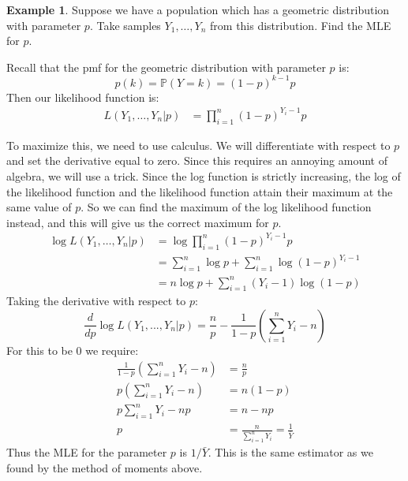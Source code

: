 \documentclass[12pt]{article}
\theoremstyle{definition}
\newtheorem*{example}{Example}
\theoremstyle{remark}
\begin{document}
\begin{example}Suppose we have a population which has a geometric distribution with parameter $p$. Take samples $Y_1, \dots, Y_n$ from this distribution. Find the MLE for $p$.

Recall that the pmf for the geometric distribution with parameter $p$ is:
\[
p(k) = \mathbb{P}(Y = k) = (1 - p)^{k-1} p
\]
Then our likelihood function is:
\begin{align*}
L(Y_1, \dots, Y_n | p) &= \prod_{i = 1}^n (1 - p)^{Y_i-1} p
\end{align*}

To maximize this, we need to use calculus. We will differentiate with respect to $p$ and set the derivative equal to zero. Since this requires an annoying amount of algebra, we will use a trick. Since the log function is strictly increasing, the log of the likelihood function and the likelihood function attain their maximum at the same value of $p$. So we can find the maximum of the log likelihood function instead, and this will give us the correct maximum for $p$.
\begin{align*}
\log L(Y_1, \dots, Y_n | p) &= \log \prod_{i = 1}^n (1 - p)^{Y_i-1} p \\
&= \sum_{i = 1}^n \log p + \sum_{i = 1}^n \log (1 - p)^{Y_i-1} \\
&= n \log p +  \sum_{i = 1}^n (Y_i-1) \log (1 - p)
\end{align*}
Taking the derivative with respect to $p$:
\[
\frac{d}{dp} \log L(Y_1, ..., Y_n | p) = \frac{n}{p} - \frac{1}{1 - p} \left( \sum_{i = 1}^n Y_i - n \right)
\]
For this to be 0 we require:
\begin{align*}
 \frac{1}{1 - p} \left( \sum_{i = 1}^n Y_i - n \right) &= \frac{n}{p} \\
p \left( \sum_{i = 1}^n Y_i - n \right) &= n(1-p) \\
p \sum_{i = 1}^n Y_i - np &= n - np \\
p &= \frac{n}{\sum_{i = 1}^n Y_i } = \frac{1}{\bar{Y}}
\end{align*}
Thus the MLE for the parameter $p$ is $1/\bar{Y}$. This is the same estimator as we found by the method of moments above.

\end{example}
\end{document}
